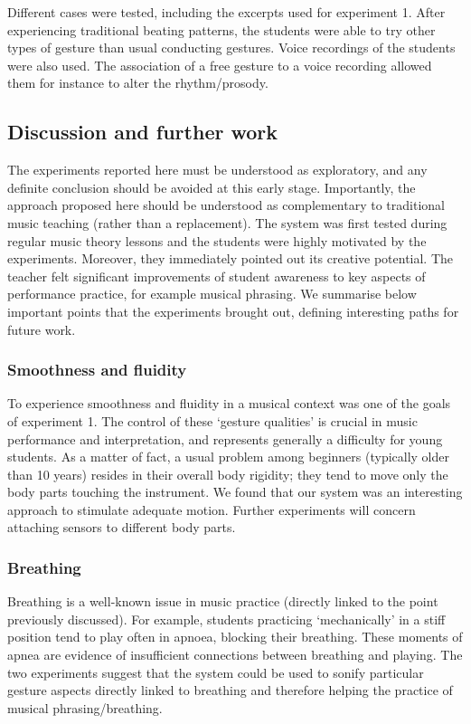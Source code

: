 Different cases were tested, including the excerpts used for experiment 1. After experiencing traditional beating patterns, the students were able to try other types of gesture than usual conducting gestures. Voice recordings of the students were also used. The association of a free gesture to a voice recording allowed them for instance to alter the rhythm/prosody.

\subsection{Discussion and further work}
The experiments reported here must be understood as exploratory, and any definite conclusion should be avoided at this early stage. Importantly, the approach proposed here should be understood as complementary to traditional music teaching (rather than a replacement). The system was first tested during regular music theory lessons and the students were highly motivated by the experiments. Moreover, they immediately pointed out its creative potential. The teacher felt significant improvements of student awareness to key aspects of performance practice, for example musical phrasing. We summarise below important points that the experiments brought out, defining interesting paths for future work. 

\subsubsection{Smoothness and fluidity}
To experience smoothness and fluidity in a musical context was one of the goals of experiment 1. The control of these `gesture qualities' is crucial in music performance and interpretation, and represents generally a difficulty for young students. As a matter of fact, a usual problem among beginners (typically older than 10 years) resides in their overall body rigidity; they tend to move only the body parts touching the instrument. We found that our system was an interesting approach to stimulate adequate motion. Further experiments will concern attaching sensors to different body parts.

\subsubsection{Breathing}
Breathing is a well-known issue in music practice (directly linked to the point previously discussed). For example, students practicing `mechanically' in a stiff position tend to play often in apnoea, blocking their breathing.  These moments of apnea are evidence of insufficient connections between breathing and playing. The two experiments suggest that the system could be used to sonify particular gesture aspects directly linked to breathing and therefore helping the practice of musical phrasing/breathing.


